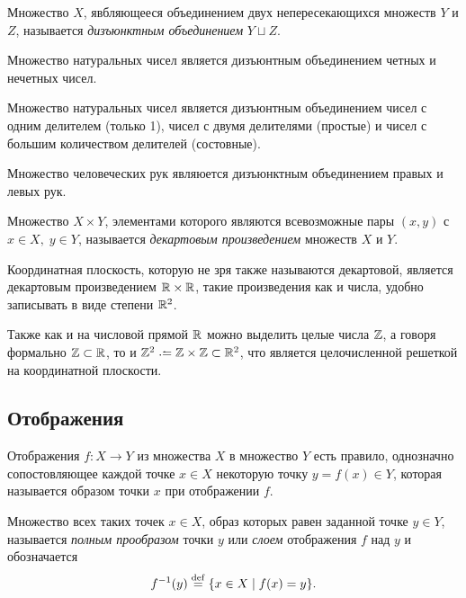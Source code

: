 \begin{definition}
    Множество $X$, явбляющееся объединением двух непересекающихся множеств $Y$ и $Z$, называется \emph{дизъюнктным объединением} $Y \sqcup Z$.
\end{definition}

\begin{example}
    Множество натуральных чисел является дизъюнтным объединением четных и нечетных чисел.

    Множество натуральных чисел является дизъюнтным объединением чисел с одним делителем (только 1), чисел с двумя делителями (простые) и чисел с большим количеством делителей (состовные).
\end{example}
\begin{example}
    Множество человеческих рук являюется дизъюнктным объединением правых и левых рук.
\end{example}

\begin{definition}
    Множество $X \times Y$, элементами которого являются всевозможные пары $(x, y)$ с $x \in X,\; y \in Y$, называется \emph{декартовым произведением} множеств $X$ и $Y$.
\end{definition}

\begin{example}
    Координатная плоскость, которую не зря также называются декартовой, является декартовым произведением $\mathbb R \times \mathbb R$, такие произведения как и числа, удобно записывать в виде степени $\mathbb R^2$.
    
    Также как и на числовой прямой $\mathbb R$ можно выделить целые числа $\mathbb Z$, а говоря формально $\mathbb Z \subset \mathbb R$, то и $\Z^2 \coloneq \Z \times \Z \subset \R^2$, что является целочисленной решеткой на координатной плоскости.
\end{example}

\subsection{Отображения}
Отображения $f \colon X \to Y $ из множества $X$ в множество $Y$ есть правило, однозначно сопостовляющее каждой точке $x \in X$ некоторую точку $y = f(x) \in Y$, которая называется образом точки $x$ при отображении $f$. 

\begin{definition}
    Множество всех таких точек $x \in X$, образ которых равен заданной точке $y \in Y$, называется \emph{полным прообразом} точки $y$ или \emph{слоем} отображения $f$ над $y$ и обозначается \[f^{-1}(y) \overset{\footnotesize{\mathrm{def}}}{=} \{x \in X \mid f(x) = y \} .\]
\end{definition}


